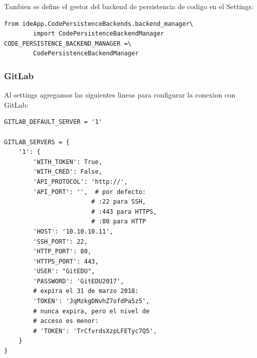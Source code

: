 Tambien se define el gestor del backend de persistencia de codigo en el Settings:
\lstset{language=Python}
\begin{lstlisting}
from ideApp.CodePersistenceBackends.backend_manager\
        import CodePersistenceBackendManager
CODE_PERSISTENCE_BACKEND_MANAGER =\
        CodePersistenceBackendManager
\end{lstlisting}
\lstset{language=Bash}


\subsubsection{GitLab}
Al settings agregamos las siguientes lineas para configurar la conexion con GitLab:
\lstset{language=Python}
\begin{lstlisting}
GITLAB_DEFAULT_SERVER = '1'

GITLAB_SERVERS = {
    '1': {
        'WITH_TOKEN': True,
        'WITH_CRED': False,
        'API_PROTOCOL': 'http://',
        'API_PORT': '',  # por defecto:
                        # :22 para SSH,
                        # :443 para HTTPS,
                        # :80 para HTTP
        'HOST': '10.10.10.11',
        'SSH_PORT': 22,
        'HTTP_PORT': 80,
        'HTTPS_PORT': 443,
        'USER': "GitEDU",
        'PASSWORD': 'GitEDU2017',
        # expira el 31 de marzo 2018:
        'TOKEN': 'JqMzkgDNvhZ7ofdPa5z5',
        # nunca expira, pero el nivel de 
        # acceso es menor:
        # 'TOKEN': 'TrCfvrdsXzpLFETyc7Q5',  
    }
}
\end{lstlisting}
\lstset{language=Bash}

